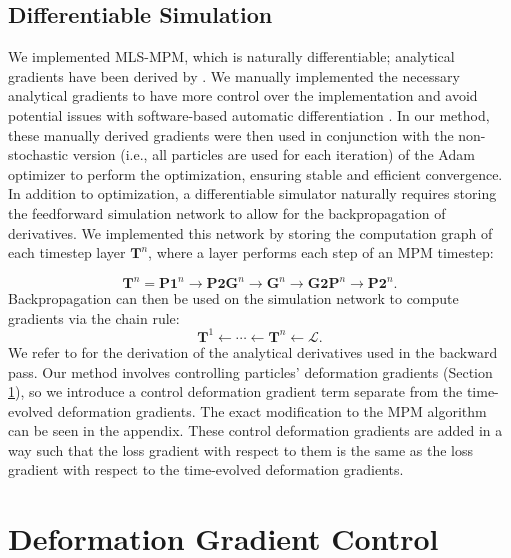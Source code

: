 \subsection{Differentiable Simulation} 
    We implemented {MLS-MPM}, which is naturally differentiable; analytical gradients have been derived by \citet{2018-ChainQueen}. 
    We manually implemented the necessary analytical gradients to have more control over the implementation and avoid potential issues with software-based automatic differentiation \citep{johnson2023software}.
    In our method, these manually derived gradients were then used in conjunction with the non-stochastic version (i.e., all particles are used for each iteration) of the Adam optimizer \citep{kingma2014adam} to perform the optimization, ensuring stable and efficient convergence.
    In addition to optimization, a differentiable simulator naturally requires storing the feedforward simulation network to allow for the backpropagation of derivatives.
    We implemented this network by storing the computation graph of each timestep layer $\textbf{T}^n$, where a layer performs each step of an MPM timestep:

    \begin{equation}
        \textbf{T}^n = \textbf{P1}^n \rightarrow \textbf{P2G}^n \rightarrow \textbf{G}^n \rightarrow \textbf{G2P}^n \rightarrow \textbf{P2}^n .
    \end{equation}
    Backpropagation can then be used on the simulation network to compute gradients via the chain rule:
    \begin{equation}
        \textbf{T}^1 \leftarrow \cdots \leftarrow \textbf{T}^n \leftarrow \mathcal{L} .
    \end{equation}
    We refer to \citet{2018-ChainQueen} for the derivation of the analytical derivatives used in the backward pass. 
    Our method involves controlling particles' deformation gradients (Section \ref{sec:control}), so we introduce a control deformation gradient term separate from the time-evolved deformation gradients.
    The exact modification to the {MPM} algorithm can be seen in the appendix.
    These control deformation gradients are added in a way such that the loss gradient with respect to them is the same as the loss gradient with respect to the time-evolved deformation gradients.

\section{Deformation Gradient Control}
\label{sec:control}

